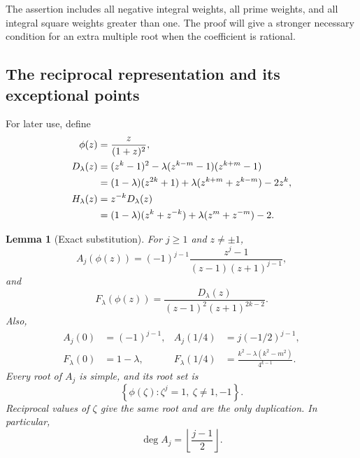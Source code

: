 \documentclass[11pt,a4paper]{article}
\newtheorem{lemma}[theorem]{Lemma}
\theoremstyle{definition}
\theoremstyle{remark}
\begin{document}
The assertion includes all negative integral weights, all prime
weights, and all integral square weights greater than one.
The proof will give a stronger necessary condition for an extra
multiple root when the coefficient is rational.

\subsection{The reciprocal representation and its exceptional points}

For later use, define
\begin{align}
 \phi(z)&=\frac{z}{(1+z)^2},\label{iw:phi}\\
 D_\lambda(z)
   &=(z^k-1)^2-\lambda(z^{k-m}-1)(z^{k+m}-1)\notag\\
   &=(1-\lambda)(z^{2k}+1)
        +\lambda(z^{k+m}+z^{k-m})-2z^k,\label{iw:D}\\
 H_\lambda(z)
   &=z^{-k}D_\lambda(z)\notag\\
   &=(1-\lambda)(z^k+z^{-k})
       +\lambda(z^m+z^{-m})-2.\label{iw:H}
\end{align}

\begin{lemma}[Exact substitution]\label{iw:substitution}
For \(j\ge1\) and \(z\ne\pm1\),
\begin{equation}\label{iw:A-substitution}
 A_j(\phi(z))
 =(-1)^{j-1}\frac{z^j-1}{(z-1)(z+1)^{j-1}},
\end{equation}
and
\begin{equation}\label{iw:F-substitution}
 F_\lambda(\phi(z))
 =\frac{D_\lambda(z)}{(z-1)^2(z+1)^{2k-2}}.
\end{equation}
Also,
\begin{align}
 A_j(0)&=(-1)^{j-1},&
 A_j(1/4)&=j(-1/2)^{j-1},\label{iw:A-endpoints}\\
 F_\lambda(0)&=1-\lambda,&
 F_\lambda(1/4)&=
 \frac{k^2-\lambda(k^2-m^2)}{4^{k-1}}.\label{iw:F-endpoints}
\end{align}
Every root of \(A_j\) is simple, and its root set is
\begin{equation}\label{iw:A-roots}
 \left\{\phi(\zeta):\zeta^j=1,\ \zeta\ne1,-1\right\}.
\end{equation}
Reciprocal values of \(\zeta\) give the same root and are the only
duplication. In particular,
\begin{equation}\label{iw:degree-A}
 \deg A_j=\left\lfloor\frac{j-1}{2}\right\rfloor.
\end{equation}
\end{lemma}
\end{document}
